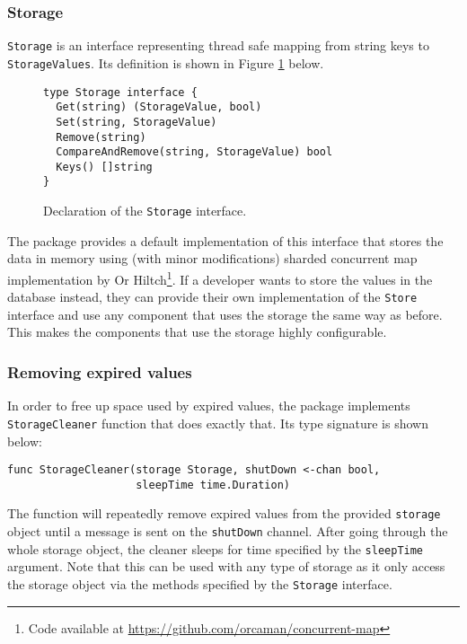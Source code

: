 \subsubsection{Storage}
\texttt{Storage} is an interface representing thread safe mapping from string keys
to \texttt{StorageValues}. Its definition is shown in Figure \ref{fig:Storage} below.
\begin{figure}[h]
\centering
\begin{lstlisting}
type Storage interface {
  Get(string) (StorageValue, bool)
  Set(string, StorageValue)
  Remove(string)
  CompareAndRemove(string, StorageValue) bool
  Keys() []string
}
\end{lstlisting}
\caption[scale=1.0]{Declaration of the \texttt{Storage} interface.}
\label{fig:Storage}
\end{figure}
The package provides a default implementation of this interface that
stores the data in memory using (with minor modifications) sharded concurrent map implementation
by Or Hiltch\footnote{Code available at \url{https://github.com/orcaman/concurrent-map}}.
If a developer wants to store the values in the 
database instead, they can provide their own implementation of the 
\texttt{Store} interface
and use any component that uses the storage the same way as before.
This makes the components that use the storage highly configurable.

\subsubsection{Removing expired values}
In order to free up space used by expired values, the package implements
\texttt{StorageCleaner} function that does exactly that. Its type signature
is shown below:
\begin{lstlisting}
func StorageCleaner(storage Storage, shutDown <-chan bool, 
                    sleepTime time.Duration)
\end{lstlisting}
The function will repeatedly remove expired values from the provided
\texttt{storage} object until a message is sent on the \texttt{shutDown}
channel. After going through the whole storage object, the cleaner 
sleeps for time specified by the \texttt{sleepTime} argument.
Note that this can be used with any type of storage as it only access
the storage object via the methods specified by the \texttt{Storage} 
interface.

